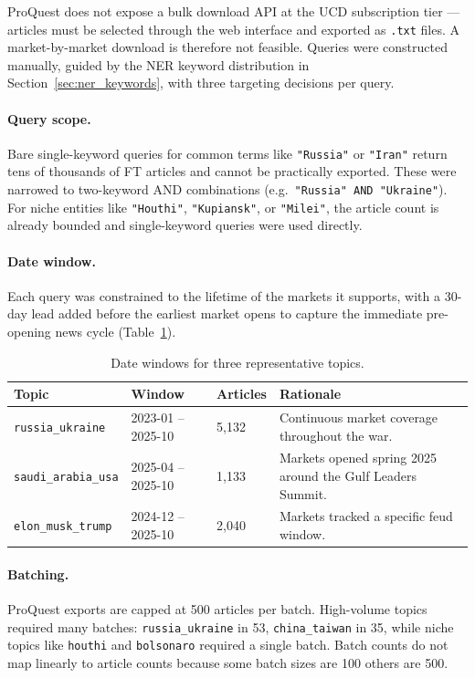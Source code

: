 \documentclass[11pt]{article}
\begin{document}
ProQuest does not expose a bulk download API at the UCD subscription
tier --- articles must be selected through the web interface and
exported as \texttt{.txt} files. A market-by-market download is
therefore not feasible. Queries were constructed manually, guided by
the NER keyword distribution in Section~\ref{sec:ner_keywords}, with
three targeting decisions per query.

\paragraph{Query scope.} Bare single-keyword queries for common
terms like \texttt{"Russia"} or \texttt{"Iran"} return tens of
thousands of FT articles and cannot be practically exported. These
were narrowed to two-keyword AND combinations (e.g.\
\texttt{"Russia" AND "Ukraine"}). For niche entities like
\texttt{"Houthi"}, \texttt{"Kupiansk"}, or \texttt{"Milei"}, the
article count is already bounded and single-keyword queries were
used directly.

\paragraph{Date window.} Each query was constrained to the lifetime
of the markets it supports, with a 30-day lead added before the
earliest market opens to capture the immediate pre-opening news
cycle (Table~\ref{tab:date_windows}).

\begin{table}[H]
\centering
\caption{Date windows for three representative topics.}
\label{tab:date_windows}
\small
\begin{tabularx}{\textwidth}{l l l X}
\toprule
\textbf{Topic} & \textbf{Window} & \textbf{Articles} & \textbf{Rationale} \\
\midrule
\texttt{russia\_ukraine}    & 2023-01 -- 2025-10 & 5{,}132
    & Continuous market coverage throughout the war. \\
\addlinespace[3pt]
\texttt{saudi\_arabia\_usa} & 2025-04 -- 2025-10 & 1{,}133
    & Markets opened spring 2025 around the Gulf Leaders Summit. \\
\addlinespace[3pt]
\texttt{elon\_musk\_trump}  & 2024-12 -- 2025-10 & 2{,}040
    & Markets tracked a specific feud window. \\
\bottomrule
\end{tabularx}
\end{table}

\paragraph{Batching.} ProQuest exports are capped at 500 articles
per batch. High-volume topics required many batches:
\texttt{russia\_ukraine} in 53, \texttt{china\_taiwan} in 35, while
niche topics like \texttt{houthi} and \texttt{bolsonaro} required
a single batch. Batch counts do not map linearly to article counts
because some batch sizes are 100 others are 500.
\end{document}
